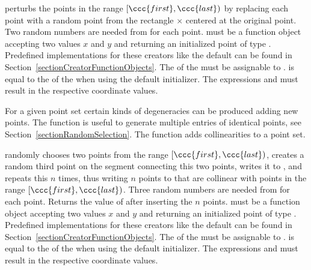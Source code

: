 { perturbs the points in the range $[\ccc{first},\ccc{last})$ by
  replacing each point with a random point from the rectangle
   $\times$  centered at the original point.
  Two random numbers are needed from  for each point.
  \ccPrecond   {} must be a function object accepting two
     values $x$ and $y$ and returning an initialized point
     of type . Predefined implementations for these
    creators like the default can be found in
    Section~\ref{sectionCreatorFunctionObjects}. The  of the
     must be assignable to .
     is equal to the  of the
     when using the default initializer.
    The expressions  and
     must result in the respective
    coordinate values.
}


For a given point set certain kinds of degeneracies can be produced
adding new points. The  function is
useful to generate multiple entries of identical points, see
Section~\ref{sectionRandomSelection}. The
 function adds collinearities to
a point set.


\def\ccLongParamLayout{\ccTrue}
{ randomly chooses two points from the range $[\ccc{first},\ccc{last})$,
    creates a random third point on the segment connecting this two
    points, writes it to , and repeats this $n$ times, thus
    writing $n$ points to  that are collinear with points
    in the range $[\ccc{first},\ccc{last})$.
    Three random numbers are needed from  for each point.
    Returns the value of  after inserting the $n$ points.
  \ccPrecond  {} must be a function object accepting two
     values $x$ and $y$ and returning an initialized point
     of type . Predefined implementations for these
    creators like the default can be found in
    Section~\ref{sectionCreatorFunctionObjects}. The  of the
     must be assignable to .
     is equal to the  of the
     when using the default initializer.
    The expressions  and
     must result in the respective
    coordinate values.
}
\def\ccLongParamLayout{\ccFalse}


